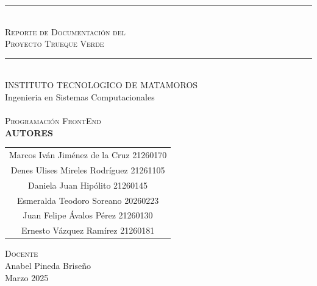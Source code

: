 \begin{titlepage}
    \centering
    
    \rule{\textwidth}{1.5pt}\\[0.5cm]
    
    \textsc{\Huge Reporte de Documentación del}\\[0.3cm]
    \textsc{\Huge Proyecto Trueque Verde}\\[0.8cm]
    
    \rule{\textwidth}{1.5pt}\\[1cm]
    
    \large INSTITUTO TECNOLOGICO DE MATAMOROS \\[0.5cm]
    Ingenieria en Sistemas Computacionales\\[1cm]
    
    \\[0.5cm]

    \textsc{Programación FrontEnd}\\[0.5cm]

    \Large\textbf{AUTORES }\\[0.5cm]
    
    {\large 
      \begin{tabular}{c}
        Marcos Iván Jiménez de la Cruz 21260170\\[0.3cm]
        Denes Ulises Mireles Rodríguez 21261105\\[0.3cm]
        Daniela Juan Hipólito 21260145\\[0.3cm]
        Esmeralda Teodoro Soreano 20260223\\[0.3cm]
        Juan Felipe Ávalos Pérez 21260130\\[0.3cm]
        Ernesto Vázquez Ramírez 21260181\\
      \end{tabular}
    \par}
    \vspace{1cm}
    
    \textsc{Docente}\\[0.2cm]
    \large Anabel Pineda Briseño  \\[1cm]        

    \large Marzo 2025
\end{titlepage}
